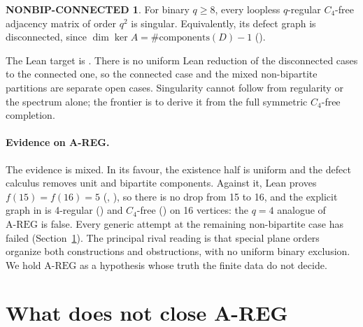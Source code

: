 \documentclass{anvil-paper}
\newcommand{\repobase}{https://github.com/rjwalters/lean-genius/blob/erdos85/integration}
\newcommand{\repofile}[2]{\href{\repobase/#1}{\lean{#2}}}
\newcommand{\AREG}{\mathrm{A\text{-}REG}}
\theoremstyle{definition}
\newtheorem*{nonbipconn}{NONBIP-CONNECTED}
\begin{document}
\begin{nonbipconn}
For binary $q\ge 8$, every loopless $q$-regular $C_4$-free adjacency matrix of order $q^2$ is singular. Equivalently, its defect graph is disconnected, since $\dim\ker A=\#\mathrm{components}(D)-1$ ().
\end{nonbipconn}

\noindent The Lean target is . There is no uniform Lean reduction of the disconnected cases to the connected one, so the connected case and the mixed non-bipartite partitions are separate open cases. Singularity cannot follow from regularity or the spectrum alone; the frontier is to derive it from the full symmetric $C_4$-free completion.

\paragraph{Evidence on A-REG.} The evidence is mixed. In its favour, the existence half is uniform and the defect calculus removes unit and bipartite components. Against it, Lean proves $f(15)=f(16)=5$ (, ), so there is no drop from 15 to 16, and the explicit graph  in \repofile{proofs/Proofs/Erdos85Problem.lean}{Erdos85Problem.lean} is 4-regular () and $C_4$-free () on 16 vertices: the $q=4$ analogue of $\AREG$ is false. Every generic attempt at the remaining non-bipartite case has failed (Section~\ref{sec:negative}). The principal rival reading is that special plane orders organize both constructions and obstructions, with no uniform binary exclusion. We hold $\AREG$ as a hypothesis whose truth the finite data do not decide.

\section{What does not close A-REG}\label{sec:negative}
\end{document}
